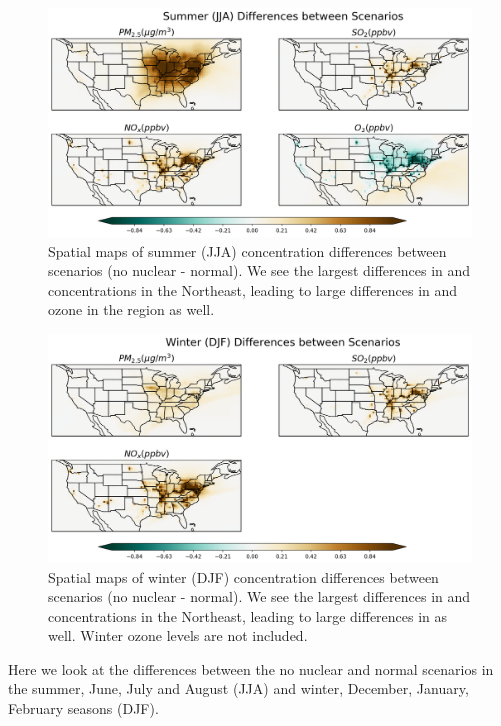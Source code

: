 \documentclass[12]{article}
\begin{document}
\begin{figure}
    \centering
    \includegraphics[scale=0.4]{ego_nonuclear_project/Figures/summer_national_dif.png}
    \caption{Spatial maps of summer (JJA) concentration differences between scenarios (no nuclear - normal). We see the largest differences in  and  concentrations in the Northeast, leading to large differences in  and ozone in the region as well.} 
    \label{fig:summer_dif}
\end{figure}
\begin{figure}
    \centering
    \includegraphics[scale=0.4]{ego_nonuclear_project/Figures/winter_national_dif.png}
    \caption{Spatial maps of winter (DJF) concentration differences between scenarios (no nuclear - normal). We see the largest differences in  and  concentrations in the Northeast, leading to large differences in  as well. Winter ozone levels are not included.} 
    \label{fig:winter_dif}
\end{figure}

Here we look at the differences between the no nuclear and normal scenarios in the summer, June, July and August (JJA) and winter, December, January, February seasons (DJF). 
\end{document}
